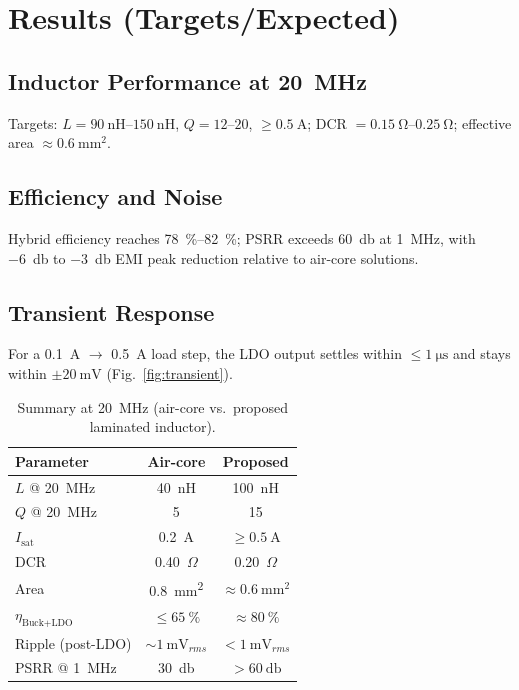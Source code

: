 \documentclass[journal]{IEEEtran}
\begin{document}
\section{Results (Targets/Expected)}
\subsection{Inductor Performance at \SI{20}{\mega\hertz}}
Targets: $L=\SIrange{90}{150}{\nano\henry}$, $Q=\numrange{12}{20}$, $\ge\SI{0.5}{\ampere}$; DCR $=\SIrange{0.15}{0.25}{\ohm}$; effective area $\approx\SI{0.6}{\milli\meter\squared}$.

\subsection{Efficiency and Noise}
Hybrid efficiency reaches \SIrange{78}{82}{\percent}; PSRR exceeds \SI{60}{\decibel} at \SI{1}{\mega\hertz}, with \SI{-6}{\decibel} to \SI{-3}{\decibel} EMI peak reduction relative to air-core solutions.

\subsection{Transient Response}
For a \SI{0.1}{\ampere} $\rightarrow$ \SI{0.5}{\ampere} load step, the LDO output settles within $\le\SI{1}{\micro\second}$ and stays within $\pm\SI{20}{\milli\volt}$ (Fig.~\ref{fig:transient}).

\begin{table}[t]
\caption{Summary at \SI{20}{\mega\hertz} (air-core vs.\ proposed laminated inductor).}
\label{tab:summary}
\centering
\begin{tabular}{lcc}
\toprule
Parameter & Air-core & Proposed \\
\midrule
$L$ @ \SI{20}{\mega\hertz} & \SI{40}{\nano\henry} & \SI{100}{\nano\henry} \\
$Q$ @ \SI{20}{\mega\hertz} & 5 & 15 \\
$I_{\text{sat}}$ & \SI{0.2}{\ampere} & $\ge\SI{0.5}{\ampere}$ \\
DCR & 0.40~\(\Omega\) & 0.20~\(\Omega\) \\
Area & \SI{0.8}{\milli\meter\squared} & $\approx\SI{0.6}{\milli\meter\squared}$ \\
$\eta_{\text{Buck+LDO}}$ & $\le\SI{65}{\percent}$ & $\approx\SI{80}{\percent}$ \\
Ripple (post-LDO) & $\sim\SI{1}{\milli\volt_{rms}}$ & $<\SI{1}{\milli\volt_{rms}}$ \\
PSRR @ \SI{1}{\mega\hertz} & \SI{30}{\decibel} & $>\SI{60}{\decibel}$ \\
\bottomrule
\end{tabular}
\end{table}
\end{document}
